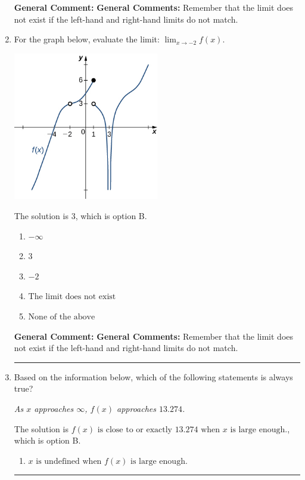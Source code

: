 \documentclass{extbook}[14pt]
\newcommand{\litem}[1]{\item #1

\rule{\textwidth}{0.4pt}}
\begin{document}
\begin{enumerate}
{\begin{enumerate}[label=\Alph*.]
\end{enumerate}

\textbf{General Comment:} \textbf{General Comments:} Remember that the limit does not exist if the left-hand and right-hand limits do not match.
}
\litem{
For the graph below, evaluate the limit: $ \displaystyle \lim_{x \rightarrow -2} f(x)$.

\begin{center}
    \includegraphics[width=0.5\textwidth]{../Figures/evaluateLimitGraphicallyCopyB.png}
\end{center}


The solution is \( 3 \), which is option B.\begin{enumerate}[label=\Alph*.]
\item \( -\infty \)


\item \( 3 \)


\item \( -2 \)


\item \( \text{The limit does not exist} \)


\item \( \text{None of the above} \)


\end{enumerate}

\textbf{General Comment:} \textbf{General Comments:} Remember that the limit does not exist if the left-hand and right-hand limits do not match.
}
\litem{
Based on the information below, which of the following statements is always true?

\begin{center}
    \textit{ As $x$ approaches $\infty$, $f(x)$ approaches $13.274$. }
\end{center}
The solution is \( f(x) \text{ is close to or exactly } 13.274 \text{ when } x \text{ is large enough}. \), which is option B.\begin{enumerate}[label=\Alph*.]
\item \( x \text{ is undefined when } f(x) \text{ is large enough}. \)



\end{enumerate}}
\end{enumerate}
\end{document}
